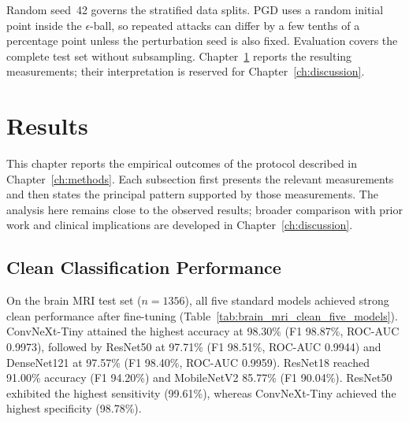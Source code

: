 \documentclass[12pt,a4paper,oneside]{report}
\begin{document}
Random seed~42 governs the stratified data splits. PGD uses a random initial point inside the $\epsilon$-ball, so repeated attacks can differ by a few tenths of a percentage point unless the perturbation seed is also fixed. Evaluation covers the complete test set without subsampling. Chapter~\ref{ch:results} reports the resulting measurements; their interpretation is reserved for Chapter~\ref{ch:discussion}.

\chapter{Results}
\label{ch:results}


This chapter reports the empirical outcomes of the protocol described in Chapter~\ref{ch:methods}. Each subsection first presents the relevant measurements and then states the principal pattern supported by those measurements. The analysis here remains close to the observed results; broader comparison with prior work and clinical implications are developed in Chapter~\ref{ch:discussion}.

\section{Clean Classification Performance}
\label{sec:results-clean}


On the brain MRI test set ($n=1356$), all five standard models achieved strong clean performance after fine-tuning (Table~\ref{tab:brain_mri_clean_five_models}). ConvNeXt-Tiny attained the highest accuracy at 98.30\% (F1 98.87\%, ROC-AUC 0.9973), followed by ResNet50 at 97.71\% (F1 98.51\%, ROC-AUC 0.9944) and DenseNet121 at 97.57\% (F1 98.40\%, ROC-AUC 0.9959). ResNet18 reached 91.00\% accuracy (F1 94.20\%) and MobileNetV2 85.77\% (F1 90.04\%). ResNet50 exhibited the highest sensitivity (99.61\%), whereas ConvNeXt-Tiny achieved the highest specificity (98.78\%).
\end{document}
